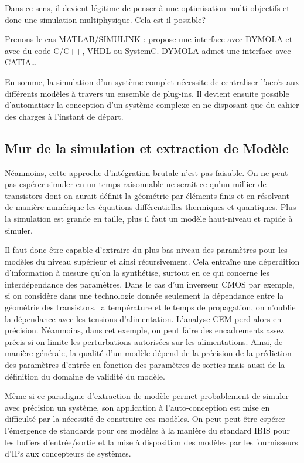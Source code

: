\documentclass[11pt]{article}
\begin{document}
Dans ce sens, il devient légitime de penser à une optimisation multi-objectifs 
et donc une simulation multiphysique. Cela est il possible?

Prenons le cas MATLAB/SIMULINK : propose une interface avec DYMOLA et avec du
code C/C++, VHDL ou SystemC. DYMOLA admet une interface avec CATIA\ldots

En somme, la simulation d'un système complet nécessite de centraliser l'accès
aux différents modèles à travers un ensemble de plug-ins. Il devient ensuite
possible d'automatiser la conception d'un système complexe en ne disposant que
du cahier des charges à l'instant de départ.

\subsection{Mur de la simulation et extraction de Modèle}

Néanmoins, cette approche d'intégration brutale n'est pas faisable. On ne peut
pas espérer simuler en un temps raisonnable ne serait ce qu'un millier de
transistors dont on aurait définit la géométrie par éléments finis et en
résolvant de manière numérique les équations différentielles thermiques et
quantiques. Plus la simulation est grande en taille, plus il faut un modèle
haut-niveau et rapide à simuler.

Il faut donc être capable d'extraire du plus bas niveau des paramètres pour les
modèles du niveau supérieur et ainsi récursivement. Cela entraîne une
déperdition d'information à mesure qu'on la synthétise, surtout en ce qui
concerne les interdépendance des paramètres. Dans le cas d'un inverseur CMOS
par exemple, si on considère dans une technologie donnée seulement la dépendance
entre la géométrie des transistors, la température et le temps de propagation,
on n'oublie la dépendance avec les tensions d'alimentation. L'analyse CEM
perd alors en précision. Néanmoins, dans cet exemple, on peut faire des
encadrements
assez précis si on limite les perturbations autorisées sur les alimentations.
Ainsi, de manière générale, la qualité d'un modèle dépend de la précision de la
prédiction des paramètres d'entrée en fonction des paramètres de sorties mais
aussi de la définition du domaine de validité du modèle.

Même si ce paradigme d'extraction de modèle permet probablement de simuler avec
précision un système, son application à l'auto-conception est mise en difficulté
par la nécessité de construire ces modèles. On peut peut-être espérer 
l'émergence de standards pour ces modèles à la manière du standard IBIS pour les
buffers d'entrée/sortie et la mise à disposition des modèles par les
fournisseurs d'IPs aux concepteurs de systèmes.
\end{document}

